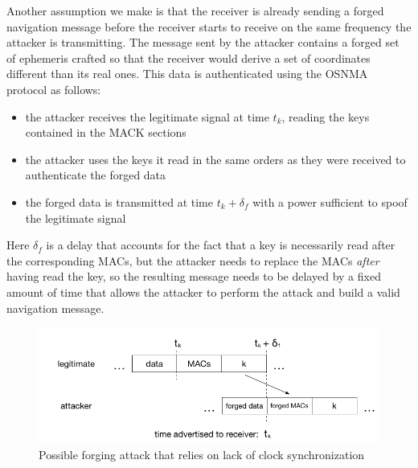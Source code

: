 Another assumption we make is that the receiver is already sending a forged
navigation message before the receiver starts to receive on the same frequency
the attacker is transmitting. The message sent by the attacker contains a forged
set of ephemeris crafted so that the receiver would derive a set of coordinates
different than its real ones. This data is authenticated using the OSNMA
protocol as follows:
\begin{itemize}
  \item the attacker receives the legitimate signal at time $t_k$, reading the
    keys contained in the MACK sections
  \item the attacker uses the keys it read in the same orders as they were
    received to authenticate the forged data
  \item the forged data is transmitted at time $t_k + \delta_f$ with a power
    sufficient to spoof the legitimate signal
\end{itemize}

Here $\delta_f$ is a delay that accounts for the fact that a key is necessarily
read after the corresponding MACs, but the attacker needs to replace the MACs
\textit{after} having read the key, so the resulting message needs to be delayed
by a fixed amount of time that allows the attacker to perform the attack and
build a valid navigation message.

\begin{figure}[h!]
  \includegraphics[width=\linewidth]{figures/delay_attack.png}
  \caption{Possible forging attack that relies on lack of clock synchronization}
  \label{fig:delay_attack}
\end{figure}

